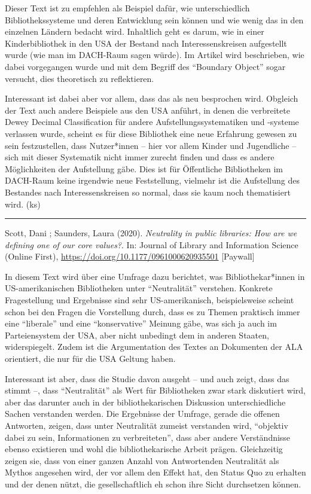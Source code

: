 \documentclass[a4paper,
fontsize=11pt,
oneside,
numbers=noperiodatend,
parskip=half-,
bibliography=totoc,
final
]{scrartcl}
\begin{document}
Dieser Text ist zu empfehlen als Beispiel dafür, wie unterschiedlich
Bibliothekssysteme und deren Entwicklung sein können und wie wenig das
in den einzelnen Ländern bedacht wird. Inhaltlich geht es darum, wie in
einer Kinderbibliothek in den USA der Bestand nach Interessenskreisen
aufgestellt wurde (wie man im DACH-Raum sagen würde). Im Artikel wird
beschrieben, wie dabei vorgegangen wurde und mit dem Begriff des
\enquote{Boundary Object} sogar versucht, dies theoretisch zu
reflektieren.

Interessant ist dabei aber vor allem, dass das als neu besprochen wird.
Obgleich der Text auch andere Beispiele aus den USA anführt, in denen
die verbreitete Dewey Decimal Classification für andere
Aufstellungssystematiken und -systeme verlassen wurde, scheint es für
diese Bibliothek eine neue Erfahrung gewesen zu sein festzustellen, dass
Nutzer*innen -- hier vor allem Kinder und Jugendliche -- sich mit dieser
Systematik nicht immer zurecht finden und dass es andere Möglichkeiten
der Aufstellung gäbe. Dies ist für Öffentliche Bibliotheken im DACH-Raum
keine irgendwie neue Feststellung, vielmehr ist die Aufstellung des
Bestandes nach Interessenskreisen so normal, dass sie kaum noch
thematisiert wird. (ks)

\begin{center}\rule{0.5\linewidth}{0.5pt}\end{center}

Scott, Dani ; Saunders, Laura (2020). \emph{Neutrality in public
libraries: How are we defining one of our core values?}. In: Journal of
Library and Information Science (Online First),
\url{https://doi.org/10.1177/0961000620935501} {[}Paywall{]}

In diesem Text wird über eine Umfrage dazu berichtet, was
Bibliothekar*innen in US-amerika\-nischen Bibliotheken unter
\enquote{Neutralität} verstehen. Konkrete Fragestellung und Ergebnisse
sind sehr US-amerikanisch, beispielsweise scheint schon bei den Fragen
die Vorstellung durch, dass es zu Themen praktisch immer eine
\enquote{liberale} und eine \enquote{konservative} Meinung gäbe, was
sich ja auch im Parteiensystem der USA, aber nicht unbedingt dem in
anderen Staaten, widerspiegelt. Zudem ist die Argumentation des Textes
an Dokumenten der ALA orientiert, die nur für die USA Geltung haben.

Interessant ist aber, dass die Studie davon ausgeht -- und auch zeigt,
dass das stimmt --, dass \enquote{Neutralität} als Wert für Bibliotheken
zwar stark diskutiert wird, aber das darunter auch in der
bibliothekarischen Diskussion unterschiedliche Sachen verstanden werden.
Die Ergebnisse der Umfrage, gerade die offenen Antworten, zeigen, dass
unter Neutralität zumeist verstanden wird, \enquote{objektiv dabei zu
sein, Informationen zu verbreiteten}, dass aber andere Verständnisse
ebenso existieren und wohl die bibliothekarische Arbeit prägen.
Gleichzeitig zeigen sie, dass von einer ganzen Anzahl von Antwortenden
Neutralität als Mythos angesehen wird, der vor allem den Effekt hat, den
Status Quo zu erhalten und der denen nützt, die gesellschaftlich eh
schon ihre Sicht durchsetzen können.
\end{document}
